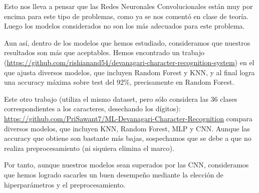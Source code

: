 \documentclass[a4]{article}
\begin{document}
Esto nos lleva a pensar que las Redes Neuronales Convolucionales están
muy por encima para este tipo de problemas, como ya se nos comentó en
clase de teoría. Luego los modelos considerados no son los más
adecuados para este problema.

Aun así, dentro de los modelos que hemos estudiado, consideramos que
nuestros resultados son más que aceptables. Hemos encontrado un
trabajo
(\href{https://github.com/rishianand54/devanagari-character-recognition-system}{https://github.com/rishianand54/devanagari-character-recognition-system})
en el que ajusta diversos modelos, que incluyen Random Forest y KNN, y
al final logra una accuracy máxima sobre test del 92\%, precisamente
en Random Forest.

Este otro trabajo (utiliza el mismo dataset, pero sólo considera las
36 clases correspondientes a los caracteres, desechando los dígitos):
\href{https://github.com/PriSawant7/ML-Devanagari-Character-Recognition}{https://github.com/PriSawant7/ML-Devanagari-Character-Recognition}
compara diversos modelos, que incluyen KNN, Random Forest, MLP y
CNN. Aunque las accuracy que obtiene son bastante más bajas,
sospechamos que se debe a que no realiza preprocesamiento (ni siquiera
elimina el marco).

Por tanto, aunque nuestros modelos sean superados por las CNN,
consideramos que hemos logrado sacarles un buen desempeño mediante la
elección de hiperparámetros y el preprocesamiento.
\end{document}
